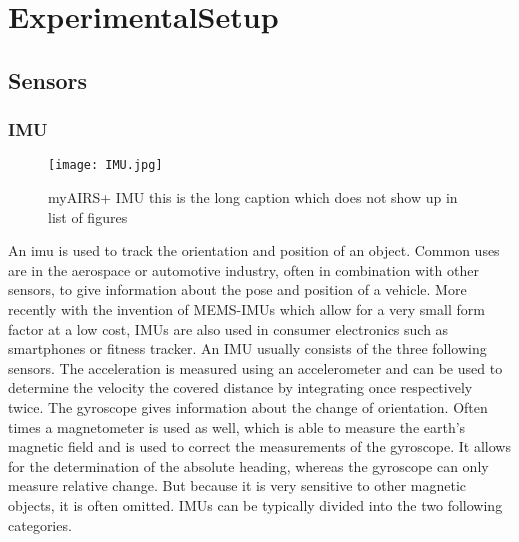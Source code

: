 \chapter{ExperimentalSetup}
\label{ch:ExperimentalSetup}

\section{Sensors}
\subsection{IMU}
\begin{figure}[htb]
	\centering
	\texttt{[image: IMU.jpg]}
	\caption[myAIRS+ IMU]{myAIRS+ IMU this is the long caption which does not show up in list of figures }
	\label{fig:imu}
\end{figure}

An \gls{imu} is used to track the orientation and position of an object. 
Common uses are in the aerospace or automotive industry, often in combination with other sensors, to give information about the pose and position of a vehicle. 
More recently with the invention of MEMS-IMUs  which allow for a very small form factor at a low cost, IMUs are also used in consumer electronics such as smartphones or fitness tracker. 
An IMU usually consists of the three following sensors.
The acceleration is measured using an accelerometer and can be used to determine the velocity the covered distance by integrating once respectively twice.
The gyroscope gives information about the change of orientation. 
Often times a magnetometer is used as well, which is able to measure the earth's magnetic field and is used to correct the measurements of the gyroscope. It allows for the determination of the absolute heading, whereas the gyroscope can only measure relative change. But because it is very sensitive to other magnetic objects, it is often omitted.
IMUs can be typically divided into the two following categories.

